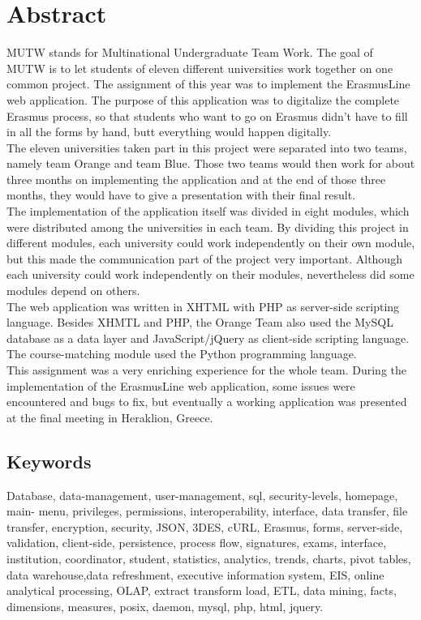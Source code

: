 \chapter*{Abstract}
\noindent \indent MUTW stands for Multinational Undergraduate Team Work. The
goal of MUTW is to let students of eleven different universities work together on one common project. The assignment of this year was to implement the ErasmusLine web application. The purpose of this application was to digitalize the complete Erasmus process, so that students who want to go on Erasmus didn’t have to fill in all the forms by hand, butt everything would happen digitally.
\ \\
\indent  The eleven universities taken part in this project were separated into
two teams, namely team Orange and team Blue. Those two teams would then work for about three months on implementing the application and at the end of those three months, they would have to give a presentation with their final result.
\ \\
\indent The implementation of the application itself was divided in eight
modules, which were distributed among the universities in each team. By dividing this project in different modules, each university could work independently on their own module, but this made the communication part of the project very important. Although each university could work independently on their modules, nevertheless did some modules depend on others.
\ \\
\indent The web application was written in XHTML with PHP as server-side
scripting language. Besides XHMTL and PHP, the Orange Team also used the MySQL
database as a data layer and JavaScript/jQuery as client-side scripting
language. The course-matching module used the Python programming language. 
\ \\ 
\indent This assignment was a very enriching experience for the whole team.
During the implementation of the ErasmusLine web application, some issues were
encountered and bugs to fix, but eventually a working application was presented
at the final meeting in Heraklion, Greece.

\section*{Keywords}
Database, data-management, user-management, sql, security-levels, homepage,
main- menu, privileges, permissions, interoperability, interface, data transfer,
file transfer, encryption, security, JSON, 3DES, cURL, Erasmus, forms,
server-side, validation, client-side, persistence, process
flow, signatures, exams, interface, institution, coordinator, student,
statistics, analytics, trends, charts, pivot tables, data warehouse,data
refreshment, executive information system, EIS, online analytical processing,
OLAP, extract transform load, ETL, data mining, facts, dimensions, measures,
posix, daemon, mysql, php, html, jquery.
